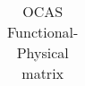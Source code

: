 \begin{table}
	\centering
	\begin{tabular}{cccccccc}

	\end{tabular}
	\caption{OCAS Functional-Physical matrix}
	\label{tab:functPhys}
\end{table}
